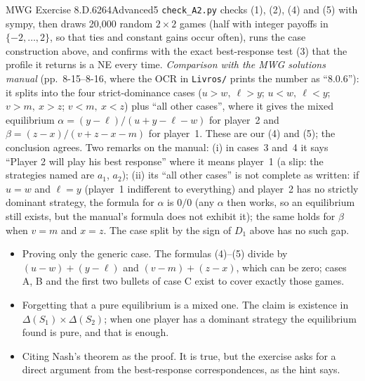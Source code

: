 \begin{exsol}{MWG Exercise 8.D.6}{264}{Advanced}{5}
\verify \texttt{check\_A2.py} checks (1), (2), (4) and (5) with sympy, then draws 20{,}000 random
$2\times2$ games (half with integer payoffs in $\{-2,\dots,2\}$, so that ties and constant gains
occur often), runs the case construction above, and confirms with the exact best-response test (3)
that the profile it returns is a NE every time. \emph{Comparison with the MWG solutions manual}
(pp.~8-15--8-16, where the OCR in \texttt{Livros/} prints the number as ``8.0.6''): it splits into
the four strict-dominance cases ($u > w,\ \ell > y$; $u < w,\ \ell < y$; $v > m,\ x > z$;
$v < m,\ x < z$) plus ``all other cases'', where it gives the mixed equilibrium
$\alpha = (y - \ell)/(u + y - \ell - w)$ for player~2 and $\beta = (z - x)/(v + z - x - m)$ for
player~1. These are our (4) and (5); the conclusion agrees. Two remarks on the manual: (i) in
cases~3 and~4 it says ``Player 2 will play his best response'' where it means player~1 (a slip:
the strategies named are $a_1$, $a_2$); (ii) its ``all other cases'' is not complete as written:
if $u = w$ and $\ell = y$ (player~1 indifferent to everything) and player~2 has no strictly
dominant strategy, the formula for $\alpha$ is $0/0$ (any $\alpha$ then works, so an equilibrium
still exists, but the manual's formula does not exhibit it); the same holds for $\beta$ when
$v = m$ and $x = z$. The case split by the sign of $D_1$ above has no such gap.

\mistakes
\begin{itemize}
  \item Proving only the generic case. The formulas (4)--(5) divide by $(u-w)+(y-\ell)$ and $(v-m)+(z-x)$, which can be zero; cases A, B and the first two bullets of case C exist to cover exactly those games.
  \item Forgetting that a pure equilibrium is a mixed one. The claim is existence in $\Delta(S_1)\times\Delta(S_2)$; when one player has a dominant strategy the equilibrium found is pure, and that is enough.
  \item Citing Nash's theorem as the proof. It is true, but the exercise asks for a direct argument from the best-response correspondences, as the hint says.
\end{itemize}

\end{exsol}
